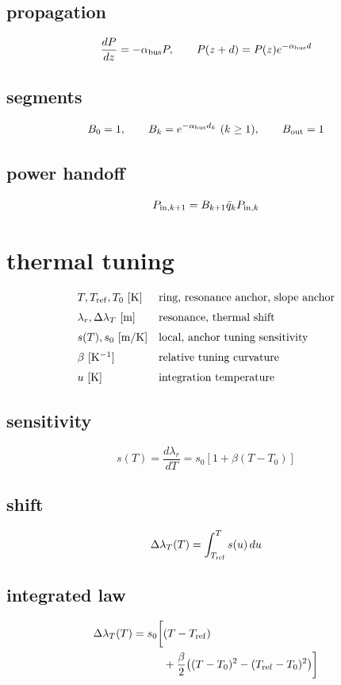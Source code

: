 \documentclass[11pt]{article}
\begin{document}
\subsection*{propagation}
\[
\displaystyle \frac{dP}{dz}=-\alpha_{\rm bus}P,\qquad P(z+d)=P(z)e^{-\alpha_{\rm bus}d}
\]
\subsection*{segments}
\[
\displaystyle B_0=1,\qquad B_k=e^{-\alpha_{\rm bus}d_k}\ (k\ge1),\qquad B_{\rm out}=1
\]
\subsection*{power handoff}
\[
\displaystyle P_{{\rm in},k+1}=B_{k+1}\bar q_kP_{{\rm in},k}
\]

\clearpage
\section*{thermal tuning}
\[
\begin{array}{ll}T,T_{\rm ref},T_0\ [\mathrm K]&\text{ring, resonance anchor, slope anchor}\\[0.6em]\lambda_r,\Delta\lambda_T\ [\mathrm m]&\text{resonance, thermal shift}\\[0.6em]s(T),s_0\ [\mathrm{m/K}]&\text{local, anchor tuning sensitivity}\\[0.6em]\beta\ [\mathrm{K^{-1}}]&\text{relative tuning curvature}\\[0.6em]u\ [\mathrm K]&\text{integration temperature}\end{array}
\]
\subsection*{sensitivity}
\[
\displaystyle s(T)=\frac{d\lambda_r}{dT}=s_0[1+\beta(T-T_0)]
\]
\subsection*{shift}
\[
\displaystyle \Delta\lambda_T(T)=\int_{T_{\rm ref}}^T s(u)\,du
\]
\subsection*{integrated law}
\[
\displaystyle \begin{aligned}\Delta\lambda_T(T)=s_0\biggl[&(T-T_{\rm ref})\\&+\frac{\beta}{2}\bigl((T-T_0)^2-(T_{\rm ref}-T_0)^2\bigr)\biggr]\end{aligned}
\]
\end{document}
